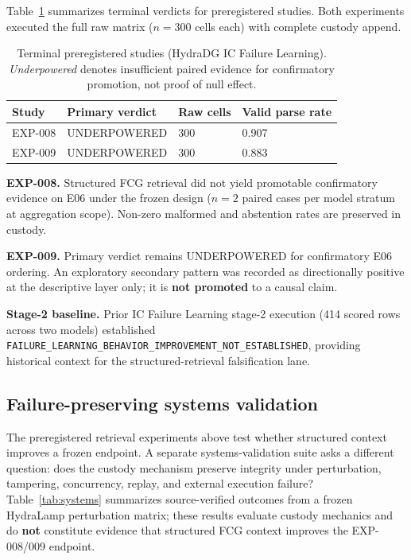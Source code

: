 \documentclass{article}
\begin{document}
Table~\ref{tab:terminal} summarizes terminal verdicts for preregistered studies.
Both experiments executed the full raw matrix ($n=300$ cells each) with complete custody append.

\begin{table}[t]
  \centering
  \caption{Terminal preregistered studies (HydraDG IC Failure Learning). \emph{Underpowered} denotes insufficient paired evidence for confirmatory promotion, not proof of null effect.}
  \label{tab:terminal}
  \begin{tabular}{llll}
    \toprule
    Study & Primary verdict & Raw cells & Valid parse rate \\
    \midrule
    EXP-008 & UNDERPOWERED & 300 & 0.907 \\
    EXP-009 & UNDERPOWERED & 300 & 0.883 \\
    \bottomrule
  \end{tabular}
\end{table}

\textbf{EXP-008.} Structured FCG retrieval did not yield promotable confirmatory evidence on E06 under the frozen design ($n=2$ paired cases per model stratum at aggregation scope). Non-zero malformed and abstention rates are preserved in custody.

\textbf{EXP-009.} Primary verdict remains UNDERPOWERED for confirmatory E06 ordering. An exploratory secondary pattern was recorded as directionally positive at the descriptive layer only; it is \textbf{not promoted} to a causal claim.

\textbf{Stage-2 baseline.} Prior IC Failure Learning stage-2 execution (414 scored rows across two models) established \texttt{FAILURE\_LEARNING\_BEHAVIOR\_IMPROVEMENT\_NOT\_ESTABLISHED}, providing historical context for the structured-retrieval falsification lane.

\subsection{Failure-preserving systems validation}

The preregistered retrieval experiments above test whether structured context improves a frozen endpoint.
A separate systems-validation suite asks a different question: does the custody mechanism preserve integrity under perturbation, tampering, concurrency, replay, and external execution failure?
Table~\ref{tab:systems} summarizes source-verified outcomes from a frozen HydraLamp perturbation matrix; these results evaluate custody mechanics and do \textbf{not} constitute evidence that structured FCG context improves the EXP-008/009 endpoint.
\end{document}
